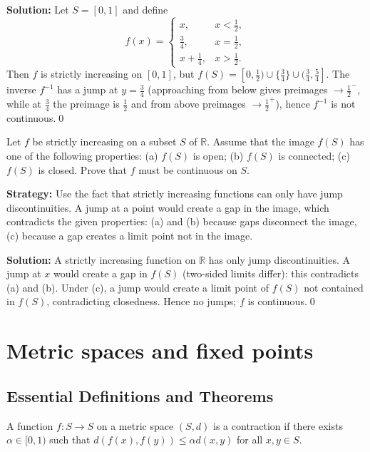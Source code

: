 \bigskip\noindent\textbf{Solution:}
Let $S=[0,1]$ and define
\[
f(x)=\begin{cases}
x,& x<\tfrac12,\\
\tfrac34,& x=\tfrac12,\\
x+\tfrac14,& x>\tfrac12.
\end{cases}
\]
Then $f$ is strictly increasing on $[0,1]$, but $f(S)=[0,\tfrac12)\cup\{\tfrac34\}\cup(\tfrac34,\tfrac54]$. The inverse $f^{-1}$ has a jump at $y=\tfrac34$ (approaching from below gives preimages $\to\tfrac12^-$, while at $\tfrac34$ the preimage is $\tfrac12$ and from above preimages $\to\tfrac12^+$), hence $f^{-1}$ is not continuous.\qed



\begin{problembox}
Let $f$ be strictly increasing on a subset $S$ of $\mathbb{R}$. Assume that the image $f(S)$ has one of the following properties: 
(a) $f(S)$ is open; (b) $f(S)$ is connected; (c) $f(S)$ is closed. Prove that $f$ must be continuous on $S$.
\end{problembox}

\noindent\textbf{Strategy:} Use the fact that strictly increasing functions can only have jump discontinuities. A jump at a point would create a gap in the image, which contradicts the given properties: (a) and (b) because gaps disconnect the image, (c) because a gap creates a limit point not in the image.

\bigskip\noindent\textbf{Solution:}
A strictly increasing function on $\mathbb{R}$ has only jump discontinuities. A jump at $x$ would create a gap in $f(S)$ (two-sided limits differ): this contradicts (a) and (b). Under (c), a jump would create a limit point of $f(S)$ not contained in $f(S)$, contradicting closedness. Hence no jumps; $f$ is continuous.\qed

\section{Metric spaces and fixed points}

\subsection*{Essential Definitions and Theorems}

\begin{definition}
A function $f: S \to S$ on a metric space $(S,d)$ is a contraction if there exists $\alpha \in [0,1)$ such that $d(f(x), f(y)) \leq \alpha d(x,y)$ for all $x,y \in S$.
\end{definition}

